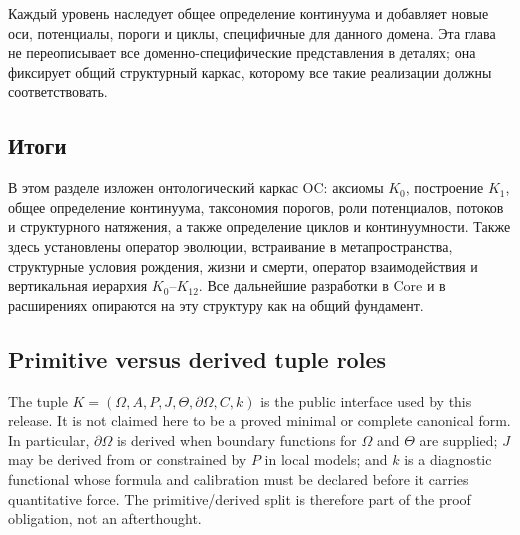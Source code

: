 Каждый уровень наследует общее определение континуума и добавляет новые оси,
потенциалы, пороги и циклы, специфичные для данного домена.
Эта глава не переописывает все доменно-специфические представления в деталях;
она фиксирует общий структурный каркас, которому все такие реализации должны соответствовать.

\subsection{Итоги}

В этом разделе изложен онтологический каркас OC:
аксиомы \(K_0\), построение \(K_1\), общее определение континуума,
таксономия порогов, роли потенциалов, потоков и структурного натяжения,
а также определение циклов и континуумности.
Также здесь установлены оператор эволюции, встраивание в метапространства,
структурные условия рождения, жизни и смерти, оператор взаимодействия и
вертикальная иерархия \(K_0\)–\(K_{12}\).
Все дальнейшие разработки в Core и в расширениях опираются на эту структуру
как на общий фундамент.


\subsection{Primitive versus derived tuple roles}
\label{sec:oc13-tuple-primitive-derived-v3}

The tuple \(K=(\Omega,A,P,J,\Theta,\partial\Omega,C,k)\) is the public interface
used by this release. It is not claimed here to be a proved minimal or complete
canonical form. In particular, \(\partial\Omega\) is derived when boundary
functions for \(\Omega\) and \(\Theta\) are supplied; \(J\) may be derived from
or constrained by \(P\) in local models; and \(k\) is a diagnostic functional
whose formula and calibration must be declared before it carries quantitative
force. The primitive/derived split is therefore part of the proof obligation,
not an afterthought.
